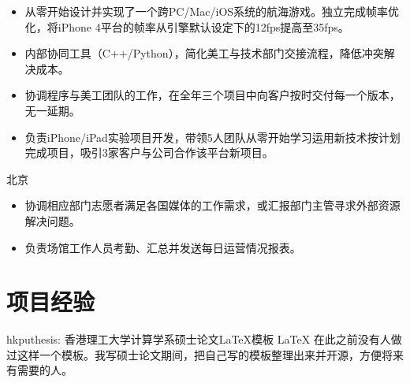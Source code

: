 \documentclass[11pt,a4paper]{moderncv/moderncv}
\begin{document}
{
\begin{itemize}
	\item 从零开始设计并实现了一个跨PC/Mac/iOS系统的航海游戏。独立完成帧率优化，将iPhone 4平台的帧率从引擎默认设定下的12fps提高至35fps。
	\item 内部协同工具（C++/Python），简化美工与技术部门交接流程，降低冲突解决成本。
	\item 协调程序与美工团队的工作，在全年三个项目中向客户按时交付每一个版本，无一延期。
	\item 负责iPhone/iPad实验项目开发，带领5人团队从零开始学习运用新技术按计划完成项目，吸引3家客户与公司合作该平台新项目。
\end{itemize}
}


{北京}{}
{
\begin{itemize}
	\item 协调相应部门志愿者满足各国媒体的工作需求，或汇报部门主管寻求外部资源解决问题。
	\item 负责场馆工作人员考勤、汇总并发送每日运营情况报表。
\end{itemize}
}


\section{项目经验}


{hkputhesis: 香港理工大学计算学系硕士论文\LaTeX 模板}
{LaTeX}
{}{}
{
在此之前没有人做过这样一个模板。我写硕士论文期间，把自己写的模板整理出来并开源，方便将来有需要的人。
}
\end{document}
